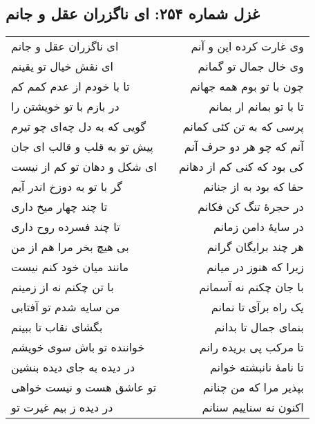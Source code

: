 \begin{center}
\section*{غزل شماره ۲۵۴: ای ناگزران عقل و جانم}
\label{sec:254}
\begin{longtable}{l p{0.5cm} r}
ای ناگزران عقل و جانم
&&
وی غارت کرده این و آنم
\\
ای نقش خیال تو یقینم
&&
وی خال جمال تو گمانم
\\
تا با خودم از عدم کمم کم
&&
چون با تو بوم همه جهانم
\\
در بازم با تو خویشتن را
&&
تا با تو بمانم ار بمانم
\\
گویی که به دل چه‌ای چو تیرم
&&
پرسی که به تن کئی کمانم
\\
پیش تو به قلب و قالب ای جان
&&
آنم که چو هر دو حرف آنم
\\
ای شکل و دهان تو کم از نیست
&&
کی بود که کنی کم از دهانم
\\
گر با تو به دوزخ اندر آیم
&&
حقا که بود به از جنانم
\\
تا چند چهار میخ داری
&&
در حجرهٔ تنگ کن فکانم
\\
تا چند فسرده روح داری
&&
در سایهٔ دامن زمانم
\\
بی هیچ بخر مرا هم از من
&&
هر چند برایگان گرانم
\\
مانند میان خود کنم نیست
&&
زیرا که هنوز در میانم
\\
با تن چکنم نه از زمینم
&&
با جان چکنم نه آسمانم
\\
من سایه شدم تو آفتابی
&&
یک راه برآی تا نمانم
\\
بگشای نقاب تا ببینم
&&
بنمای جمال تا بدانم
\\
خواننده تو باش سوی خویشم
&&
تا مرکب پی بریده رانم
\\
در دیده به جای دیده بنشین
&&
تا نامهٔ نانبشته خوانم
\\
تو عاشق هست و نیست خواهی
&&
بپذیر مرا که من چنانم
\\
در دیده ز بیم غیرت تو
&&
اکنون نه سناییم سنانم
\\
\end{longtable}
\end{center}
